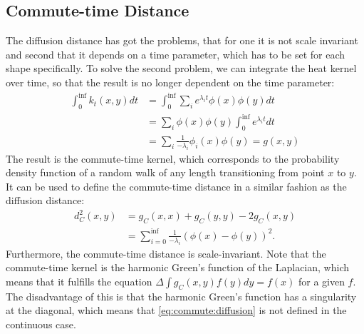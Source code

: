 \subsection{Commute-time Distance}
The diffusion distance has got the problems, that for one it is not scale invariant and second that it depends on a time parameter, which has to be set for each shape specifically.
To solve the second problem, we can integrate the heat kernel over time, so that the result is no longer dependent on the time parameter:
\begin{equation}
	\begin{split}
		\int_0^{\inf} k_t(x,y)dt &= \int_0^{\inf} \sum_i e^{\lambda_i t}\phi(x)\phi(y) dt \\
		&= \sum_i \phi(x)\phi(y) \int_0^{\inf} e^{\lambda_i t} dt \\
		&= \sum_i \frac{1}{-\lambda_i} \phi_i(x) \phi(y) = g(x,y)
	\end{split}
	\label{eq:commute:kernel}
\end{equation}
The result is the commute-time kernel, which corresponds to the probability density function of a random walk of any length transitioning from point $x$ to $y$.
It can be used to define the commute-time distance in a similar fashion as the diffusion distance:
\begin{align}
	d_C^2(x,y) &= g_C(x,x) + g_C(y,y) -2g_C(x,y) \label{eq:commute:diffusion} \\
	&= \sum_{i=0}^{\inf} \frac{1}{-\lambda_i} (\phi(x)-\phi(y))^2. \label{eq:commute}
\end{align}
Furthermore, the commute-time distance is scale-invariant.
Note that the commute-time kernel is the harmonic Green's function of the Laplacian, which means that it fulfills the equation $\Delta \int g_C(x,y) f(y) dy  = f(x)$ for a given $f$.
The disadvantage of this is that the harmonic Green's function has a singularity at the diagonal, which means that \eqref{eq:commute:diffusion} is not defined in the continuous case.

